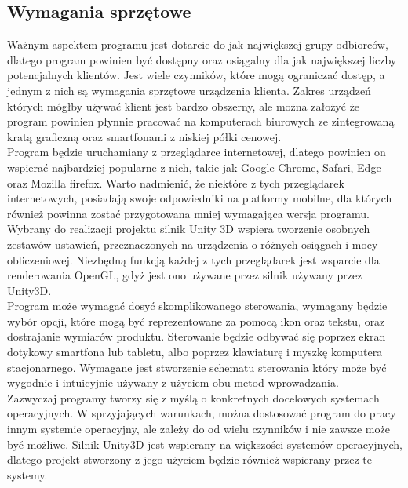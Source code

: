 \documentclass{article} %
\begin{document}
    \subsection{Wymagania sprzętowe}
        Ważnym aspektem programu jest dotarcie do jak największej grupy odbiorców, dlatego program powinien być dostępny oraz osiągalny dla jak największej liczby potencjalnych klientów. Jest wiele czynników, które mogą ograniczać dostęp, a jednym z nich są wymagania sprzętowe urządzenia klienta. Zakres urządzeń których mógłby używać klient jest bardzo obszerny, ale można założyć że program powinien płynnie pracować na komputerach biurowych ze zintegrowaną kratą graficzną oraz smartfonami z niskiej półki cenowej.
        \\
        
        Program będzie uruchamiany z przeglądarce internetowej, dlatego powinien on wspierać najbardziej popularne z nich, takie jak Google Chrome, Safari, Edge oraz Mozilla firefox. Warto nadmienić, że niektóre z tych przeglądarek internetowych, posiadają swoje odpowiedniki na platformy mobilne, dla których również powinna zostać przygotowana mniej wymagająca wersja programu. Wybrany do realizacji projektu silnik Unity 3D wspiera tworzenie osobnych zestawów ustawień, przeznaczonych na urządzenia o różnych osiągach i mocy obliczeniowej. Niezbędną funkcją każdej z tych przeglądarek jest wsparcie dla renderowania OpenGL, gdyż jest ono używane przez silnik używany przez Unity3D.
        \\
        
        Program może wymagać dosyć skomplikowanego sterowania, wymagany będzie wybór opcji, które mogą być reprezentowane za pomocą ikon oraz tekstu, oraz dostrajanie wymiarów produktu. Sterowanie będzie odbywać się poprzez ekran dotykowy smartfona lub tabletu, albo poprzez klawiaturę i myszkę komputera stacjonarnego. Wymagane jest stworzenie schematu sterowania który może być wygodnie i intuicyjnie używany z użyciem obu metod wprowadzania.
        \\
        
        Zazwyczaj programy tworzy się z myślą o konkretnych docelowych systemach operacyjnych. W sprzyjających warunkach, można dostosować program do pracy innym systemie operacyjny, ale zależy do od wielu czynników i nie zawsze może być możliwe. Silnik Unity3D jest wspierany na większości systemów operacyjnych, dlatego projekt stworzony z jego użyciem będzie również wspierany przez te systemy.
        \\
        
\end{document}
